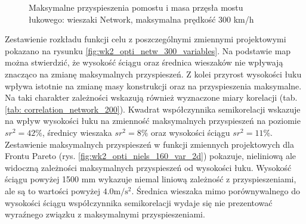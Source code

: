 \begin{figure}[hbt!]
	\centering
	\captionsetup{justification=centering}
	\caption{Maksymalne przyspieszenia pomostu i masa przęsła mostu łukowego: wieszaki Network, maksymalna prędkość 300 km/h}
	\label{fig:wk2_opti_netw_300_all}
\end{figure}

Zestawienie rozkładu funkcji celu z poszczególnymi zmiennymi projektowymi pokazano na rysunku \ref{fig:wk2_opti_netw_300_variables}. Na podstawie map można stwierdzić, że wysokość ściągu oraz średnica wieszaków nie wpływają znacząco na zmianę maksymalnych przyspieszeń. Z kolei przyrost wysokości łuku wpływa istotnie na zmianę masy konstrukcji oraz na przyspieszenia maksymalne. Na taki charakter zależności wskazują również wyznaczone miary korelacji (tab. \ref{tab: correlation_network_200}). Kwadrat współczynnika semikorelacji wskazuje na wpływ wysokości łuku na zmienność maksymalnych przyspieszeń na poziomie $sr^2=42\%$, średnicy wieszaka $sr^2 = 8\%$ oraz wysokości ściągu $sr^2 = 11\%$. Zestawienie maksymalnych przyspieszeń w funkcji zmiennych projektowych dla Frontu Pareto (rys. \ref{fig:wk2_opti_niels_160_var_2d}) pokazuje, nieliniową ale widoczną zależności maksymalnych przyspieszeń od wysokości łuku. Wysokość ściągu powyżej 1500 mm wykazuje niemal liniową zależność z przyspieszeniami, ale są to wartości powyżej $4.0 \mathrm{m/s^2}$. Średnica wieszaka mimo porównywalnego do wysokości ściągu współczynnika semikorelacji wydaje się nie prezentować wyraźnego związku z maksymalnymi przyspieszeniami.

